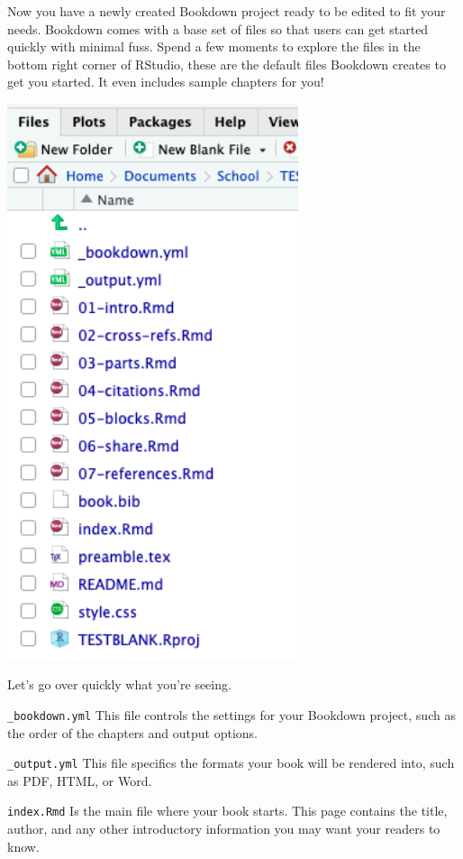 \documentclass[
]{book}
\theoremstyle{definition}
\theoremstyle{definition}
\theoremstyle{definition}
\theoremstyle{definition}
\theoremstyle{remark}
\begin{document}
Now you have a newly created Bookdown project ready to be edited to fit your needs. Bookdown comes with a base set of files so that users can get started quickly with minimal fuss. Spend a few moments to explore the files in the bottom right corner of RStudio, these are the default files Bookdown creates to get you started. It even includes sample chapters for you!

\includegraphics[width=3.36in]{images/tutorialscreenshots/filestructure}

Let's go over quickly what you're seeing.

\texttt{\_bookdown.yml} This file controls the settings for your Bookdown project, such as the order of the chapters and output options.

\texttt{\_output.yml} This file specifics the formats your book will be rendered into, such as PDF, HTML, or Word.

\texttt{index.Rmd} Is the main file where your book starts. This page contains the title, author, and any other introductory information you may want your readers to know.
\end{document}
